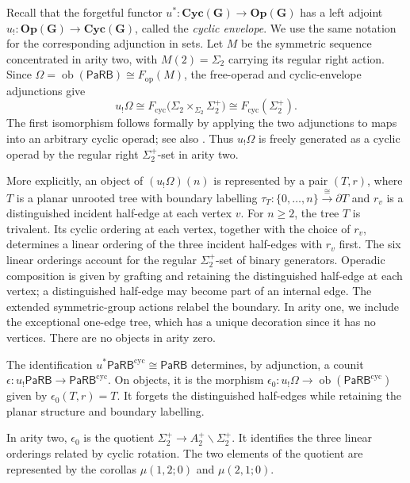 \documentclass{amsart}
\newcommand{\Grpd}{\mathbf{G}}
\newcommand{\PaRB}{\mathsf{PaRB}}
\newcommand{\magma}{\mathsf{\Omega}}
\newcommand{\Cyc}{\mathbf{Cyc}}
\newcommand{\Op}{\mathbf{Op}}
\newcommand{\ob}{\operatorname{ob}}
\theoremstyle{definition}
\numberwithin{equation}{section}
\begin{document}
Recall that the forgetful functor
$u^*\colon\Cyc(\Grpd)\to\Op(\Grpd)$ has a left adjoint
$u_!\colon\Op(\Grpd)\to\Cyc(\Grpd)$, called the \emph{cyclic
envelope}. We use the same notation for the corresponding adjunction
in sets. Let $M$ be the symmetric sequence concentrated in arity two,
with $M(2)=\Sigma_2$ carrying its regular right action. Since
$\magma=\ob(\PaRB)\cong F_{\mathrm{op}}(M)$, the free-operad and
cyclic-envelope adjunctions give
\[
u_!\magma
\cong
F_{\mathrm{cyc}}
\bigl(\Sigma_2\times_{\Sigma_2}\Sigma_2^+\bigr)
\cong
F_{\mathrm{cyc}}(\Sigma_2^+).
\]
The first isomorphism follows formally by applying the two
adjunctions to maps into an arbitrary cyclic operad; see also
\cite[Lemma~3.1 and Section~9.11]{Ward}.
Thus $u_!\magma$ is freely generated as a cyclic operad by the
regular right $\Sigma_2^+$-set in arity two.

More explicitly, an object of $(u_!\magma)(n)$ is represented by a
pair $(T,r)$, where $T$ is a planar unrooted tree with boundary
labelling
$\tau_T\colon\{0,\ldots,n\}\xrightarrow{\cong}\partial T$
and $r_v$ is a distinguished incident half-edge at each vertex $v$.
For $n\geq2$, the tree $T$ is trivalent. Its cyclic ordering at each
vertex, together with the choice of $r_v$, determines a linear
ordering of the three incident half-edges with $r_v$ first. The six
linear orderings account for the regular $\Sigma_2^+$-set of binary
generators. Operadic composition is given by grafting and retaining
the distinguished half-edge at each vertex; a distinguished half-edge
may become part of an internal edge. The extended symmetric-group
actions relabel the boundary. In arity one, we include the exceptional
one-edge tree, which has a unique decoration since it has no vertices.
There are no objects in arity zero.

The identification $u^*\PaRB^{\mathrm{cyc}}\cong\PaRB$ determines,
by adjunction, a counit
$\epsilon\colon u_!\PaRB\to\PaRB^{\mathrm{cyc}}$. On objects,
it is the morphism
$\epsilon_0\colon u_!\magma\to\ob(\PaRB^{\mathrm{cyc}})$ given by
$\epsilon_0(T,r)=T$. It forgets the distinguished half-edges while
retaining the planar structure and boundary labelling.

In arity two, $\epsilon_0$ is the quotient
$\Sigma_2^+\to A_2^+\backslash\Sigma_2^+$. It identifies the three
linear orderings related by cyclic rotation. The two elements of the
quotient are represented by the corollas
$\mu(1,2;0)$ and $\mu(2,1;0)$.
\end{document}
